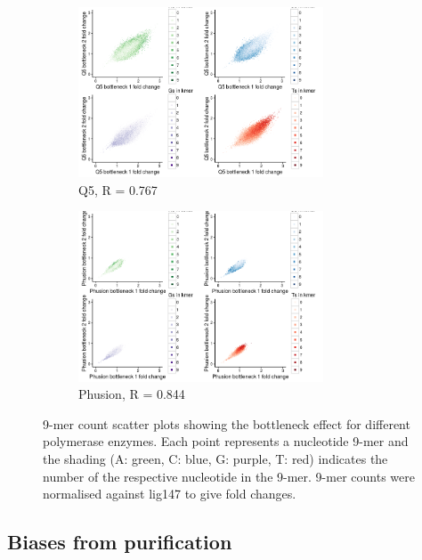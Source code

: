 \documentclass[a4paper, numbers=noenddot]{scrbook}
\begin{document}
\begin{figure}[htbp]
  \ContinuedFloat
  \centering
  \begin{subfigure}[htbp]{0.8\textwidth}
    \centering
    \includegraphics[width=0.8\textwidth]{kmer_q5BN}
    \caption{Q5, R = 0.767}
    \label{fig:kmer_bn_q5}
  \end{subfigure}
  \begin{subfigure}[htbp]{0.8\textwidth}
    \centering
    \includegraphics[width=0.8\textwidth]{kmer_phusionBN}
    \caption{Phusion, R = 0.844}
    \label{fig:kmer_bn_phusion}
  \end{subfigure}
  \caption{9-mer count scatter plots showing the bottleneck effect for different polymerase enzymes.  Each point represents a nucleotide 9-mer and the shading (A: green, C: blue, G: purple, T: red) indicates the number of the respective nucleotide in the 9-mer.  9-mer counts were normalised against lig147 to give fold changes.}
\end{figure}

\subsection{Biases from purification}
\label{ssec:pcrbias_result_pur}
\end{document}
